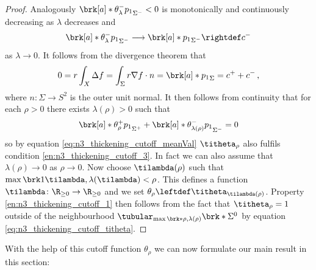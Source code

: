 \begin{proof}
  Analogously $\brk[a]*{\theta_{\lambda}^-p_1}_{\Sigma^-}<0$ is
  monotonically and continuously decreasing as $\lambda$ decreases and 
  \begin{align*}
    \brk[a]*{\theta_\lambda^-p_1}_{\Sigma^-}\longrightarrow \brk[a]*{p_1}_{\Sigma^-}\rightdef c^-
  \end{align*}
  as $\lambda\to0$. It follows from the divergence theorem that
  \begin{align*}
    0=r\int_X\Delta f=\int_\Sigma r\nabla f\cdot n=\brk[a]*{p_1}_\Sigma
    =c^++c^-\,,
  \end{align*}
  where $n\colon\Sigma\to S^2$ is the outer unit normal.
  It then follows from continuity that for each $\rho>0$ there exists $\lambda(\rho)>0$ such that
  \begin{align*}
    \brk[a]*{\theta_\rho^+p_1}_{\Sigma^+}+\brk[a]*{\theta_{\lambda(\rho)}^-p_1}_{\Sigma^-}=0
  \end{align*}
  so by equation \eqref{eq:n3_thickening_cutoff_meanVal} $\titheta_\rho$ also fulfils condition \ref{en:n3_thickening_cutoff_3}.
  In fact we can also assume that $\lambda(\rho)\to0$ as $\rho\to0$.
  Now choose $\tilambda(\rho)$ such that $\max\brk1{\tilambda,\lambda(\tilambda)}<\rho$.
  This defines a function $\tilambda\colon \R_{\geq0}\to\R_{\geq0}$ and we set
  $\theta_\rho\leftdef \titheta_{\tilambda(\rho)}$. 
  Property \ref{en:n3_thickening_cutoff_1} then follows from the fact that $\titheta_\rho=1$ outside of the neighbourhood $\tubular_{\max\brk*{\rho,\lambda(\rho)}}\brk*{\Sigma^0}$ by
  equation \ref{eq:n3_thickening_cutoff_titheta}.
\end{proof}
With the help of this cutoff function $\theta_\rho$ we can now formulate our main result in this section:
